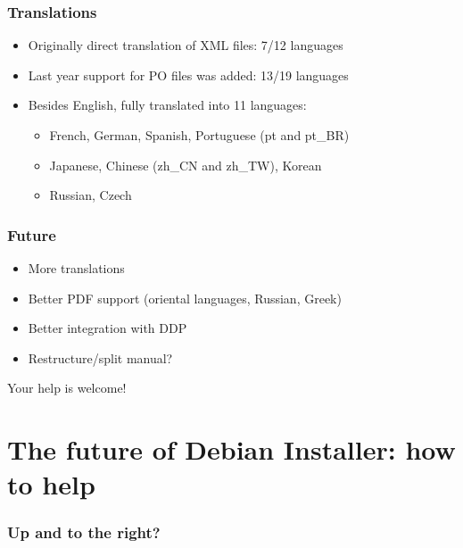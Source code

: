 \documentclass{beamer}
\begin{document}
\begin{frame}
  \frametitle{Translations}
	\begin{itemize}
	\item
		Originally direct translation of XML files: 7/12 languages
	\item
		Last year support for PO files was added: 13/19 languages
	\item
		Besides English, fully translated into 11 languages:
		\begin{itemize}
		\item
			French, German, Spanish, Portuguese (pt and pt\_BR)
		\item
			Japanese, Chinese (zh\_CN and zh\_TW), Korean
		\item
			Russian, Czech
		\end{itemize}
	\end{itemize}
\end{frame}

\begin{frame}
  \frametitle{Future}
	\begin{itemize}
	\item
		More translations
	\item
		Better PDF support (oriental languages, Russian, Greek)
	\item
		Better integration with DDP
	\item
		Restructure/split manual?
	\end{itemize}
    \vspace{1cm}
	
	\huge{Your help is welcome!}
\end{frame}


\section{The future of Debian Installer: how to help}

\begin{frame}
  \frametitle{Up and to the right?}
\end{frame}
\end{document}

